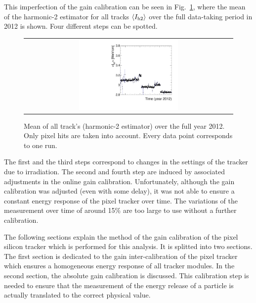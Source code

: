 This imperfection of the gain calibration can be seen in Fig.~\ref{fig:StabilityPlot_beforeCalibration}, where the mean of the harmonic-2 estimator for all tracks $\langle I_{\text{h2}} \rangle$ over the full data-taking period in 2012 is shown.
Four different steps can be spotted.
\begin{figure}[!b]
  \centering 
  \begin{tabular}{c}
  \includegraphics[width=0.49\textwidth]{figures/analysis/PixelCalibration/StabilityPlot_Pixel_beforeCalibration_withoutStepFits_NEW.pdf}
  \end{tabular}
  \caption{Mean of all track's \dedx (harmonic-2 estimator) over the full year 2012. Only pixel hits are taken into account. Every data point corresponds to one run.} 
  \label{fig:StabilityPlot_beforeCalibration}
\end{figure}
The first and the third steps correspond to changes in the settings of the tracker due to irradiation.
The second and fourth step are induced by associated adjustments in the online gain calibration.
Unfortunately, although the gain calibration was adjusted (even with some delay), it was not able to ensure a constant energy response of the pixel tracker over time. 
The variations of the \dedx measurement over time of around 15\% are too large to use \dedx without a further calibration. 

The following sections explain the method of the gain calibration of the pixel silicon tracker which is performed for this analysis. 
It is splitted into two sections. 
The first section is dedicated to the gain inter-calibration of the pixel tracker which ensures a homogeneous energy response of all tracker modules.
In the second section, the absolute gain calibration is discussed. 
This calibration step is needed to ensure that the measurement of the energy release of a particle is actually translated to the correct physical value.



